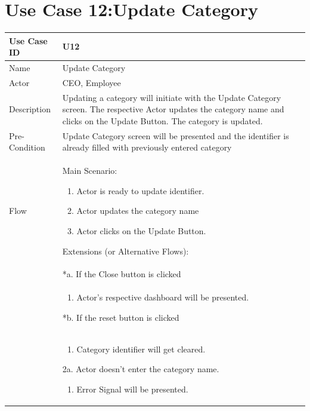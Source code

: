 \documentclass[12pt,a4paper]{report}
\begin{document}
\section{Use Case 12:Update Category}

\begin{tabular}{ | m{3cm} | m{12cm}| } \hline

Use Case ID &  U12 \\\hline

Name  	    &  Update Category \\ \hline

Actor     	& CEO, Employee \\ \hline

Description &  Updating a category will initiate with the Update Category screen. The respective Actor updates the category name and clicks on the Update Button. The category is updated.  \\ \hline

Pre-Condition &  Update Category screen will be presented and the identifier is already filled with previously entered category \\ \hline

Flow & Main Scenario:

\begin{enumerate}

\item Actor is ready to update identifier.
\item Actor updates the category name
\item Actor clicks on the Update Button.

\end{enumerate}

Extensions (or Alternative Flows):\\
& *a. If the Close button is clicked \\
& \begin{enumerate}
		\item Actor's respective dashboard will be presented.
	\end{enumerate}
*b. If the reset button is clicked \\
&	\begin{enumerate}
		\item Category identifier will get cleared.
	\end{enumerate}
2a. Actor doesn't enter the category name.
 	\begin{enumerate}
		\item Error Signal will be presented.
	\end{enumerate}
\\ \hline
\end{tabular}
\end{document}

